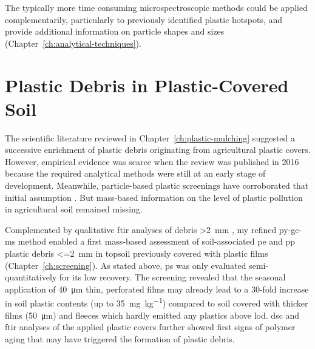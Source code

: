 The typically more time consuming microspectroscopic methods could be applied complementarily, particularly to previously identified plastic hotspots, and provide additional information on particle shapes and sizes (Chapter~\ref{ch:analytical-techniques}).

\section{Plastic Debris in Plastic-Covered Soil}
\label{sec:general-discussion:screening}

The scientific literature reviewed in Chapter~\ref{ch:plastic-mulching} suggested a successive enrichment of plastic debris originating from agricultural plastic covers. However, empirical evidence was scarce when the review was published in 2016 because the required analytical methods were still at an early stage of development. Meanwhile, particle-based plastic screenings have corroborated that initial assumption \citep{HuangAgricultural2020,ZhouMicroplastics2020}. But mass-based information on the level of plastic pollution in agricultural soil remained missing.

Complemented by qualitative \ac{ftir} analyses of debris \SI{>2}{\milli\meter} \citep{CowgerMicroplastic2021}, my refined \ac{py-gc-ms} method enabled a first mass-based assessment of soil-associated \ac{pe} and \ac{pp} plastic debris \SI{<=2}{\milli\meter} in topsoil previously covered with plastic films (Chapter~\ref{ch:screening}). As stated above, \ac{ps} was only evaluated semi-quantitatively for its low recovery.
The screening revealed that the seasonal application of \SI{40}{\micro\meter} thin, perforated films may already lead to a 30-fold increase in soil plastic contents (up to \SI{35}{\milli\gram\per\kilo\gram}) compared to soil covered with thicker films (\SI{50}{\micro\meter}) and fleeces which hardly emitted any plastics above \ac{lod}. \Ac{dsc} and \ac{ftir} analyses of the applied plastic covers further showed first signs of polymer aging that may have triggered the formation of plastic debris.

